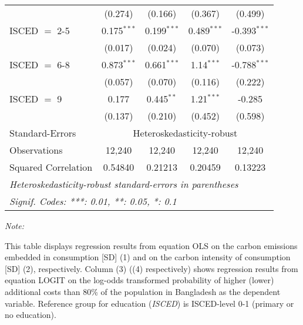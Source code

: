 \begin{table}[htbp!]
\begin{adjustbox}{width = 1\textwidth, max height = 0.95\textheight, center}
\begin{threeparttable}[b]
\begin{tabular}{lcccc}
                                 & (0.274)            & (0.166)            & (0.367)        & (0.499)\\   
            ISCED $=$ 2-5        & 0.175$^{***}$      & 0.199$^{***}$      & 0.489$^{***}$  & -0.393$^{***}$\\   
                                 & (0.017)            & (0.024)            & (0.070)        & (0.073)\\   
            ISCED $=$ 6-8        & 0.873$^{***}$      & 0.661$^{***}$      & 1.14$^{***}$   & -0.788$^{***}$\\   
                                 & (0.057)            & (0.070)            & (0.116)        & (0.222)\\   
            ISCED $=$ 9          & 0.177              & 0.445$^{**}$       & 1.21$^{***}$   & -0.285\\   
                                 & (0.137)            & (0.210)            & (0.452)        & (0.598)\\   
            \midrule 
            Standard-Errors & \multicolumn{4}{c}{Heteroskedasticity-robust} \\ 
            Observations         & 12,240             & 12,240             & 12,240         & 12,240\\  
            Squared Correlation  & 0.54840            & 0.21213            & 0.20459        & 0.13223\\  
            \midrule \midrule
            \multicolumn{5}{l}{\emph{Heteroskedasticity-robust standard-errors in parentheses}}\\
            \multicolumn{5}{l}{\emph{Signif. Codes: ***: 0.01, **: 0.05, *: 0.1}}\\
         \end{tabular}
         
         \begin{tablenotes}\item \medskip \textit{Note:}
            \item This table displays regression results from equation OLS on the carbon emissions embedded in consumption [SD] (1) and on the carbon intensity of consumption [SD] (2), respectively. 
                                      Column (3) ((4) respectively) shows regression results from equation LOGIT on the log-odds transformed probability of higher (lower) additional costs than 80\% of the population in Bangladesh as the dependent variable. Reference group for education (\textit{ISCED}) is ISCED-level 0-1 (primary or no education).
         \end{tablenotes}
      \end{threeparttable}
   \end{adjustbox}
\end{table}


